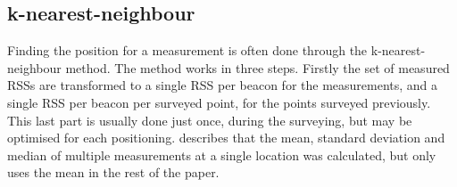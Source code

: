 \subsection{k-nearest-neighbour}
\begin{comment}
The one-shot positioning algorithm is a function that maps from a measurement $M$, using a survey database $S$ to a probability distribution over positions $P$.

\begin{equation}
M \xrightarrow{S} P
\end{equation}

Finding the position for a measurement is often done through the k-nearest-neighbour method\citet{bahl2000radar}.
The method works in two steps: first the measured RSS is compared with the surveyed RSS for each point $s$ in the database (or a subset thereof of all plausible points), and a ``distance'' $d_{M,s}$ is calculated for each point, describing how far the measured RSS lies from the RSS surveyed at that point; second, using the distances to each point, $P$ is calculated.

The first step is usually done by taking the Manhattan-distance
\begin{equation}
    d_{M, s)} = \sum_{b \epsilon B}|M_b-s_b|
    \label{eq:manhattan}
\end{equation}
or the Euclidean-distance
\begin{equation}
    d_{M, s)} = \sum_{b \epsilon B}(M_b-s_b)^2
    \label{eq:euclidean}
\end{equation}
on the dB values, although in many cases it is not clear what is being used.
Most research has focussed on the second step, using the sorted list of distances to find $P$.
\begin{equation}
    D=\{d_0,p_0\},\{d_1,p_1\},\ldots  \quad \quad d_i \leq d_{i+1}
\end{equation}

\end{comment}

Finding the position for a measurement is often done through the k-nearest-neighbour method\citet{bahl2000radar}.
The method works in three steps.
Firstly the set of measured RSSs are transformed to a single RSS per beacon for the measurements, and a single RSS per beacon per surveyed point, for the points surveyed previously.
This last part is usually done just once, during the surveying, but may be optimised for each positioning.
\citet{bahl2000radar} describes that the mean, standard deviation and median of multiple measurements at a single location was calculated, but only uses the mean in the rest of the paper.

